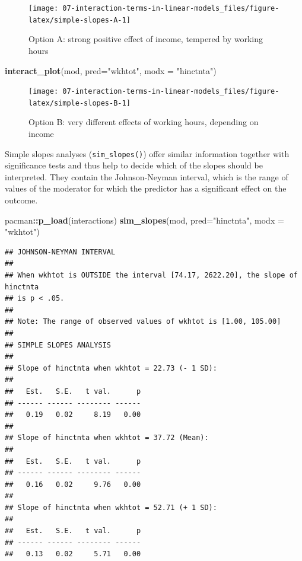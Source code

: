 \documentclass[
]{book}
\newenvironment{Shaded}{\begin{snugshade}}{\end{snugshade}}
\newcommand{\DataTypeTok}[1]{\textcolor[rgb]{0.13,0.29,0.53}{#1}}
\newcommand{\KeywordTok}[1]{\textcolor[rgb]{0.13,0.29,0.53}{\textbf{#1}}}
\newcommand{\NormalTok}[1]{#1}
\newcommand{\OperatorTok}[1]{\textcolor[rgb]{0.81,0.36,0.00}{\textbf{#1}}}
\newcommand{\StringTok}[1]{\textcolor[rgb]{0.31,0.60,0.02}{#1}}
\begin{document}
\begin{figure}

{\centering \texttt{[image: 07-interaction-terms-in-linear-models\_files/figure-latex/simple-slopes-A-1]} 

}

\caption{Option A: strong positive effect of income, tempered by working hours}\label{fig:simple-slopes-A}
\end{figure}

\begin{Shaded}
\begin{Highlighting}[]
\KeywordTok{interact_plot}\NormalTok{(mod, }\DataTypeTok{pred=}\StringTok{"wkhtot"}\NormalTok{, }\DataTypeTok{modx =} \StringTok{"hinctnta"}\NormalTok{)}
\end{Highlighting}
\end{Shaded}

\begin{figure}

{\centering \texttt{[image: 07-interaction-terms-in-linear-models\_files/figure-latex/simple-slopes-B-1]} 

}

\caption{Option B: very different effects of working hours, depending on income}\label{fig:simple-slopes-B}
\end{figure}

Simple slopes analyses (\texttt{sim\_slopes()}) offer similar information together with significance tests and thus help to decide which of the slopes should be interpreted. They contain the Johnson-Neyman interval, which is the range of values of the moderator for which the predictor has a significant effect on the outcome.

\begin{Shaded}
\begin{Highlighting}[]
\NormalTok{pacman}\OperatorTok{::}\KeywordTok{p_load}\NormalTok{(interactions)}
\KeywordTok{sim_slopes}\NormalTok{(mod, }\DataTypeTok{pred=}\StringTok{"hinctnta"}\NormalTok{, }\DataTypeTok{modx =} \StringTok{"wkhtot"}\NormalTok{)}
\end{Highlighting}
\end{Shaded}

\begin{verbatim}
## JOHNSON-NEYMAN INTERVAL 
## 
## When wkhtot is OUTSIDE the interval [74.17, 2622.20], the slope of hinctnta
## is p < .05.
## 
## Note: The range of observed values of wkhtot is [1.00, 105.00]
## 
## SIMPLE SLOPES ANALYSIS 
## 
## Slope of hinctnta when wkhtot = 22.73 (- 1 SD): 
## 
##   Est.   S.E.   t val.      p
## ------ ------ -------- ------
##   0.19   0.02     8.19   0.00
## 
## Slope of hinctnta when wkhtot = 37.72 (Mean): 
## 
##   Est.   S.E.   t val.      p
## ------ ------ -------- ------
##   0.16   0.02     9.76   0.00
## 
## Slope of hinctnta when wkhtot = 52.71 (+ 1 SD): 
## 
##   Est.   S.E.   t val.      p
## ------ ------ -------- ------
##   0.13   0.02     5.71   0.00
\end{verbatim}
\end{document}
